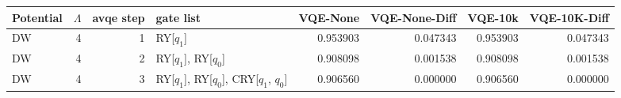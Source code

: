 \begin{tabular}{lrrlrrrr}
\toprule
Potential & $\Lambda$ & avqe step & gate list & VQE-None & VQE-None-Diff & VQE-10k & VQE-10K-Diff \\
\midrule
DW & 4 & 1 & RY[$q_1$] & 0.953903 & 0.047343 & 0.953903 & 0.047343 \\
DW & 4 & 2 & RY[$q_1$], RY[$q_0$] & 0.908098 & 0.001538 & 0.908098 & 0.001538 \\
DW & 4 & 3 & RY[$q_1$], RY[$q_0$], CRY[$q_1$, $q_0$] & 0.906560 & 0.000000 & 0.906560 & 0.000000 \\
\bottomrule
\end{tabular}
